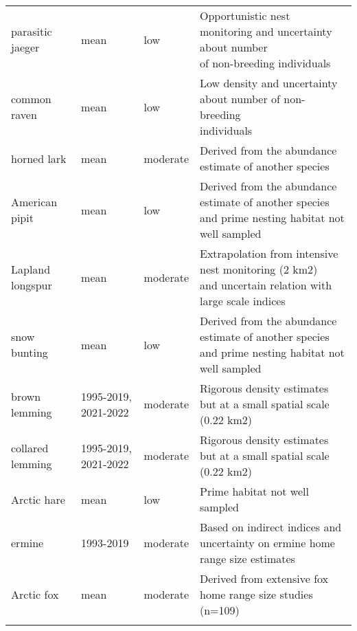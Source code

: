 \begin{longtable}{llll}
  parasitic jaeger & mean & low & \makecell[tl]{Opportunistic nest monitoring and uncertainty about number\\of non-breeding individuals } \\ 
  common raven & mean & low & \makecell[tl]{Low density and uncertainty about number of non-breeding\\individuals} \\ 
  horned lark & mean & moderate & Derived from the abundance estimate of another species \\ 
  American pipit & mean & low & \makecell[tl]{Derived from the abundance estimate of another species\\and prime nesting habitat not well sampled} \\ 
  Lapland longspur & mean & moderate & \makecell[tl]{Extrapolation from intensive nest monitoring (2 km2)\\and uncertain relation with large scale indices} \\ 
  snow bunting & mean & low & \makecell[tl]{Derived from the abundance estimate of another species\\and prime nesting habitat not well sampled} \\ 
  brown lemming & 1995-2019, 2021-2022 & moderate & \makecell[tl]{Rigorous density estimates but at a small spatial scale\\(0.22 km2)} \\ 
  collared lemming & 1995-2019, 2021-2022 & moderate & \makecell[tl]{Rigorous density estimates but at a small spatial scale\\(0.22 km2)} \\ 
  Arctic hare & mean & low & Prime habitat not well sampled \\ 
  ermine & 1993-2019 & moderate & \makecell[tl]{Based on indirect indices and uncertainty on ermine home\\range size estimates} \\ 
  Arctic fox & mean & moderate & Derived from extensive fox home range size studies (n=109) \\ 
   \hline
\hline
\label{table:confidence_estimate_abundance}
\end{longtable}
\endgroup

